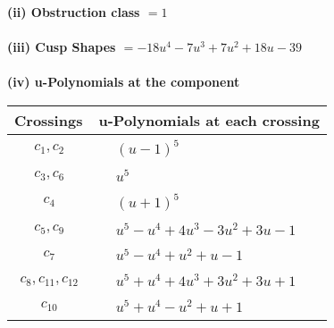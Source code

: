 \documentclass[1p]{elsarticle_modified}
\theoremstyle{definition}
\begin{document}
\flushleft \textbf{(ii) Obstruction class $= 1$}\\~\\
\flushleft \textbf{(iii) Cusp Shapes $= -18 u^4-7 u^3+7 u^2+18 u-39$}\\~\\
\newpage\renewcommand{\arraystretch}{1}
\flushleft \textbf{(iv) u-Polynomials at the component}\newline \\
\begin{tabular}{m{50pt}|m{274pt}}
Crossings & \hspace{64pt}u-Polynomials at each crossing \\
\hline $$\begin{aligned}c_{1},c_{2}\end{aligned}$$&$\begin{aligned}
&(u-1)^5
\end{aligned}$\\
\hline $$\begin{aligned}c_{3},c_{6}\end{aligned}$$&$\begin{aligned}
&u^5
\end{aligned}$\\
\hline $$\begin{aligned}c_{4}\end{aligned}$$&$\begin{aligned}
&(u+1)^5
\end{aligned}$\\
\hline $$\begin{aligned}c_{5},c_{9}\end{aligned}$$&$\begin{aligned}
&u^5- u^4+4 u^3-3 u^2+3 u-1
\end{aligned}$\\
\hline $$\begin{aligned}c_{7}\end{aligned}$$&$\begin{aligned}
&u^5- u^4+u^2+u-1
\end{aligned}$\\
\hline $$\begin{aligned}c_{8},c_{11},c_{12}\end{aligned}$$&$\begin{aligned}
&u^5+u^4+4 u^3+3 u^2+3 u+1
\end{aligned}$\\
\hline $$\begin{aligned}c_{10}\end{aligned}$$&$\begin{aligned}
&u^5+u^4- u^2+u+1
\end{aligned}$\\
\hline
\end{tabular}\\~\\
\end{document}
